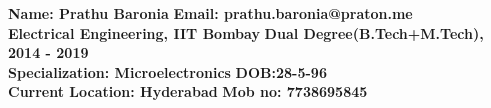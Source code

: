 \documentclass{resume}
\begin{document}


{\bf Name: Prathu Baronia} \hfill {\bf Email: prathu.baronia@praton.me}\\
{\bf Electrical Engineering, IIT Bombay} \hfill {\bf Dual Degree(B.Tech+M.Tech),
	2014 - 2019}\\
{\bf Specialization: Microelectronics} \hfill {\bf DOB:28-5-96}\\
{\bf Current Location: Hyderabad} \hfill {\bf Mob no: 7738695845}\\


\end{document}
